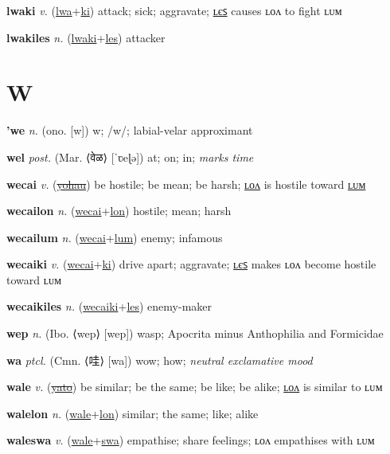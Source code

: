 \textbf{\hypertarget{lwaki}{lwaki}} \textit{v.} (\hyperlink{lwa}{lwa}+\allowbreak \hyperlink{ki}{ki})
attack; sick; aggravate; \hyperlink{lwakiles}{ʟєꜱ} causes ʟᴏᴧ to fight ʟᴜᴍ

\textbf{\hypertarget{lwakiles}{lwakiles}} \textit{n.} (\hyperlink{lwaki}{lwaki}+\allowbreak \hyperlink{les}{les})
attacker

\section{W}

\textbf{\hypertarget{'we}{'we}} \textit{n.} (ono. [w])
w; /w/; labial-velar approximant

\textbf{\hypertarget{wel}{wel}} \textit{post.} (Mar. ⟨{\devanagari{}वेळ}⟩ [ˈʋeɭə])
at; on; in; \textit{marks time}

\textbf{\hypertarget{wecai}{wecai}} \textit{v.} (\hyperlink{yohau}{\sout{yohau}})
be hostile; be mean; be harsh; \hyperlink{wecailon}{ʟᴏᴧ} is hostile toward \hyperlink{wecailum}{ʟᴜᴍ}

\textbf{\hypertarget{wecailon}{wecailon}} \textit{n.} (\hyperlink{wecai}{wecai}+\allowbreak \hyperlink{lon}{lon})
hostile; mean; harsh

\textbf{\hypertarget{wecailum}{wecailum}} \textit{n.} (\hyperlink{wecai}{wecai}+\allowbreak \hyperlink{lum}{lum})
enemy; infamous

\textbf{\hypertarget{wecaiki}{wecaiki}} \textit{v.} (\hyperlink{wecai}{wecai}+\allowbreak \hyperlink{ki}{ki})
drive apart; aggravate; \hyperlink{wecaikiles}{ʟєꜱ} makes ʟᴏᴧ become hostile toward ʟᴜᴍ

\textbf{\hypertarget{wecaikiles}{wecaikiles}} \textit{n.} (\hyperlink{wecaiki}{wecaiki}+\allowbreak \hyperlink{les}{les})
enemy-maker

\textbf{\hypertarget{wep}{wep}} \textit{n.} (Ibo. ⟨wep⟩ [wep])
wasp; Apocrita minus Anthophilia and Formicidae

\textbf{\hypertarget{wa}{wa}} \textit{ptcl.} (Cmn. ⟨{\chinese{}哇}⟩ [wa])
wow; how; \textit{neutral exclamative mood}

\textbf{\hypertarget{wale}{wale}} \textit{v.} (\hyperlink{yato}{\sout{yato}})
be similar; be the same; be like; be alike; \hyperlink{walelon}{ʟᴏᴧ} is similar to ʟᴜᴍ

\textbf{\hypertarget{walelon}{walelon}} \textit{n.} (\hyperlink{wale}{wale}+\allowbreak \hyperlink{lon}{lon})
similar; the same; like; alike

\textbf{\hypertarget{waleswa}{waleswa}} \textit{v.} (\hyperlink{wale}{wale}+\allowbreak \hyperlink{swa}{swa})
empathise; share feelings; ʟᴏᴧ empathises with ʟᴜᴍ

